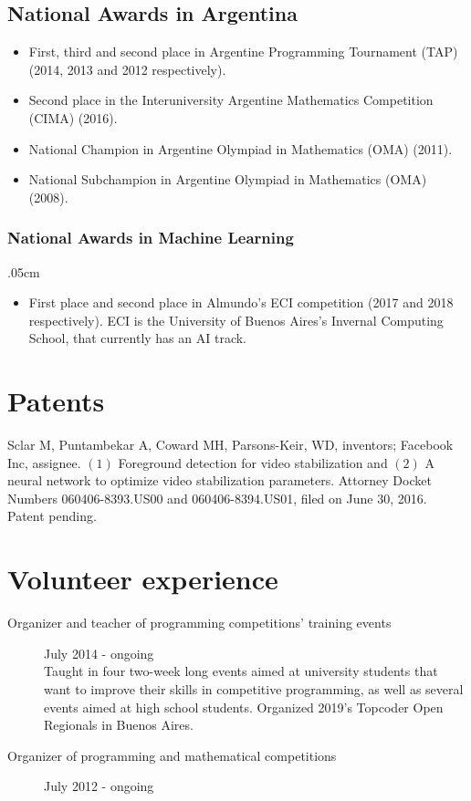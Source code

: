 \documentclass [a4paper, 11pt]{article}
\begin{document}
\subsection* {National Awards in Argentina}

\begin{itemize} \itemsep.0cm
    \item[] First, third and second place in Argentine Programming Tournament (TAP) (2014, 2013 and 2012 respectively).
    \item[] Second place in the Interuniversity Argentine Mathematics Competition (CIMA) (2016).
	\item[] National Champion in Argentine Olympiad in Mathematics (OMA) (2011).
	\item[] National Subchampion in Argentine Olympiad in Mathematics (OMA) (2008).
\end{itemize}

\subsubsection* {National Awards in Machine Learning} \itemsep.05cm
\begin{itemize}
\item[] First place and second place in Almundo's ECI competition (2017 and 2018 respectively). ECI is the University of Buenos Aires's Invernal Computing School, that currently has an AI track.
\end{itemize}

\section* {Patents}
Sclar M, Puntambekar A, Coward MH, Parsons-Keir, WD, inventors; Facebook Inc,
assignee. $(1)$ Foreground detection for video stabilization and $(2)$ A neural network to 
optimize video stabilization parameters. Attorney Docket Numbers 060406-8393.US00 
and 060406-8394.US01, filed on June 30, 2016. Patent pending.

\section* {Volunteer experience}
\begin{description}
\item[Organizer and teacher of programming competitions' training events] {\hfill July 2014 - ongoing \\
  Taught in four two-week long events aimed at university students that 
  want to improve their skills in competitive programming, as well as 
  several events aimed at high school students. Organized 2019's Topcoder
  Open Regionals in Buenos Aires.
}
\item[Organizer of programming and mathematical competitions] { \hfill July 2012 - ongoing \\
}
\end{description}
\end{document}

